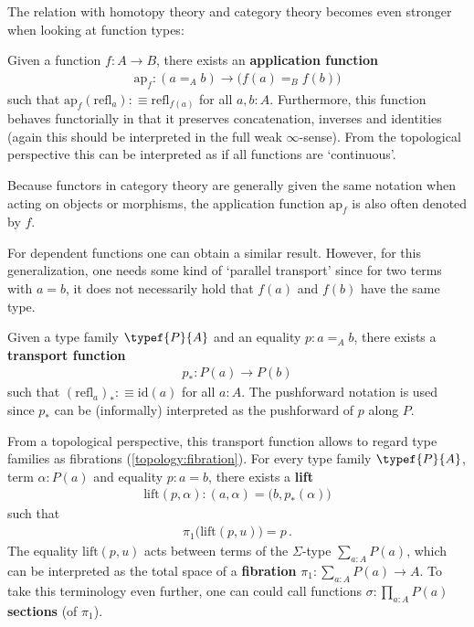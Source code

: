     The relation with homotopy theory and category theory becomes even stronger when looking at function types:
    \begin{property}
        Given a function $f:A\rightarrow B$, there exists an \textbf{application function}
        \begin{gather}
            \mathrm{ap}_f:(a=_Ab)\rightarrow\bigl(f(a)=_Bf(b)\bigr)
        \end{gather}
        such that $\mathrm{ap}_f(\mathrm{refl}_a):\equiv\mathrm{refl}_{f(a)}$ for all $a,b:A$. Furthermore, this function behaves functorially in that it preserves concatenation, inverses and identities (again this should be interpreted in the full weak $\infty$-sense). From the topological perspective this can be interpreted as if all functions are `continuous'.
    \end{property}
    \begin{notation}
        Because functors in category theory are generally given the same notation when acting on objects or morphisms, the application function $\mathrm{ap}_f$ is also often denoted by $f$.
    \end{notation}

    For dependent functions one can obtain a similar result. However, for this generalization, one needs some kind of `parallel transport' since for two terms with $a=b$, it does not necessarily hold that $f(a)$ and $f(b)$ have the same type.
    \begin{property}[Transport]
        Given a type family $\typef{P}{A}$ and an equality $p:a=_Ab$, there exists a \textbf{transport function}
        \begin{gather}
            p_*:P(a)\rightarrow P(b)
        \end{gather}
        such that $(\mathrm{refl}_a)_*:\equiv\mathrm{id}(a)$ for all $a:A$. The pushforward notation is used since $p_*$ can be (informally) interpreted as the pushforward of $p$ along $P$.

        From a topological perspective, this transport function allows to regard type families as fibrations (\cref{topology:fibration}). For every type family $\typef{P}{A}$, term $\alpha:P(a)$ and equality $p:a=b$, there exists a \textbf{lift}
        \begin{gather}
            \mathrm{lift}(p,\alpha):(a,\alpha) = \bigl(b,p_*(\alpha)\bigr)
        \end{gather}
        such that
        \begin{gather}
            \pi_1\bigl(\mathrm{lift}(p,u)\bigr)=p\,.
        \end{gather}
        The equality $\mathrm{lift}(p,u)$ acts between terms of the $\Sigma$-type $\sum_{a:A}P(a)$, which can be interpreted as the total space of a \textbf{fibration} $\pi_1:\sum_{a:A}P(a)\rightarrow A$. To take this terminology even further, one can could call functions $\sigma:\prod_{a:A}P(a)$ \textbf{sections} (of $\pi_1$).
    \end{property}

